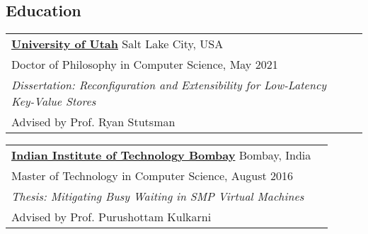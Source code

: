 \documentclass[margin,line]{res}
\begin{document}
\name{Chinmay Kulkarni (www.chinmayk.net) %
}
\begin{resume}


\section{\sc Education}
 \begin{tabular}{@{}p{5.5in}p{4in}}
 {\bf \href{http://www.cs.utah.edu/}{University of Utah}} \dotfill Salt Lake City,
  USA \\
 {\small Doctor of Philosophy in Computer Science, May 2021} \\
 {\small \emph{Dissertation: Reconfiguration and Extensibility for Low-Latency Key-Value Stores}} \\
 {\small Advised by Prof. Ryan Stutsman}
 \end{tabular}

 \vspace{-7pt}
 \begin{tabular}{@{}p{5.5in}p{4in}}
 {\bf \href{http://www.cse.iitb.ac.in/}{Indian Institute of
 Technology Bombay}} \dotfill Bombay, India
 \\ {\small Master of Technology in Computer Science, August 2016} \\
 {\small \emph{Thesis: Mitigating Busy Waiting in SMP Virtual Machines}}\\
 {\small Advised by Prof. Purushottam Kulkarni}
 \end{tabular}


\end{resume}
\end{document}
